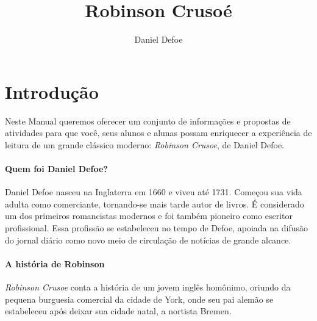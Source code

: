 \documentclass[12pt]{extarticle}
\begin{document}
\newcommand{\AutorLivro}{Daniel Defoe}
\newcommand{\TituloLivro}{Robinson Crusoé}
\newcommand{\Tema}{Ficção, mistério e fantasia}
\newcommand{\Genero}{Romance}
\newcommand{\imagemCapa}{./images/PNLD0013-01.png}
\newcommand{\issnppub}{---}
\newcommand{\issnepub}{---}
\newcommand{\colaborador}{\textbf{Iuri Pereira} é uma pessoa incrível e vai fazer um bom serviço.}


\title{\TituloLivro}
\author{\AutorLivro}
\def\authornotes{\colaborador}

\date{}
\maketitle


\begin{abstract}
\lipsum[1-3]
\end{abstract}

\tableofcontents

\section{Introdução}

Neste Manual queremos oferecer um conjunto de informações e propostas de
atividades para que você, seus alunos e alunas possam enriquecer a
experiência de leitura de um grande clássico moderno: \emph{Robinson
Crusoe}, de Daniel Defoe.

\paragraph{Quem foi Daniel Defoe?}
Daniel Defoe nasceu na Inglaterra em 1660 e viveu até 1731. Começou sua
vida adulta como comerciante, tornando-se mais tarde autor de livros. É
considerado um dos primeiros romancistas modernos e foi também pioneiro
como escritor profissional. Essa profissão se estabeleceu no tempo de
Defoe, apoiada na difusão do jornal diário como novo meio de circulação
de notícias de grande alcance.


\paragraph{A história de Robinson}
\emph{Robinson Crusoe} conta a história de um jovem inglês homônimo,
oriundo da pequena burguesia comercial da cidade de York, onde seu pai
alemão se estabeleceu após deixar sua cidade natal, a nortista Bremen.
\end{document}
